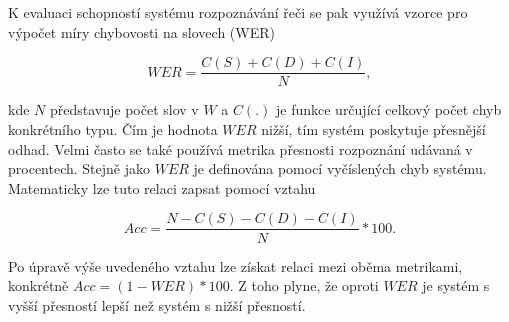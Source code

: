 \noindent K evaluaci schopností systému rozpoznávání řeči se pak využívá vzorce pro výpočet míry chybovosti na slovech (WER)

\begin{equation}
  WER = \frac{C(S) + C(D) + C(I)}{N},
  \label{eq:asr:decoding:wer}
\end{equation}

\noindent kde $N$ představuje počet slov v $\hat{W}$ a $C(.)$ je funkce určující celkový počet chyb konkrétního typu. Čím je hodnota $WER$ nižší, tím systém poskytuje přesnější odhad. Velmi často se také používá metrika přesnosti rozpoznání udávaná v procentech. Stejně jako $WER$ je definována pomocí vyčíslených chyb systému. Matematicky lze tuto relaci zapsat pomocí vztahu

\begin{equation}
  Acc = \frac{N - C(S) - C(D) - C(I)}{N} * 100.
  \label{eq:asr:decoding:acc}
\end{equation}

\noindent Po úpravě výše uvedeného vztahu lze získat relaci mezi oběma metrikami, konkrétně $Acc = \left(1 - WER\right) * 100$. Z toho plyne, že oproti $WER$ je systém s vyšší přesností lepší než systém s nižší přesností.

